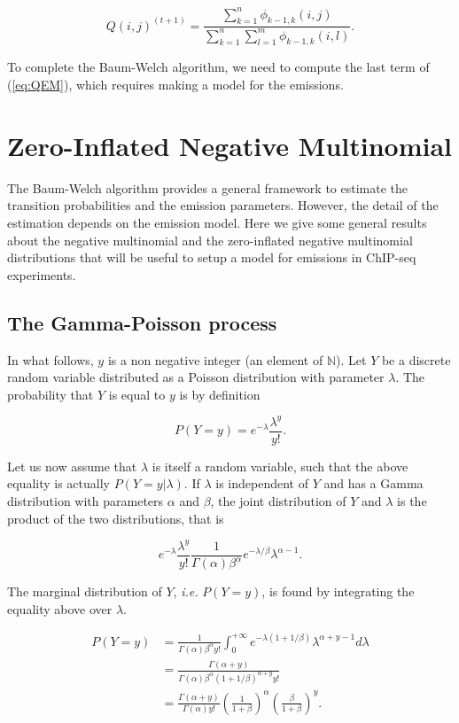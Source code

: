 \documentclass[12pt]{article}
\begin{document}
\begin{appendices}
    $$ Q(i,j)^{(t+1)} = \frac{\sum_{k=1}^n \phi_{k-1,k}(i,j)}
      {\sum_{k=1}^n\sum_{l=1}^m\phi_{k-1,k}(i,l)}. $$
    
    To complete the Baum-Welch algorithm, we need to compute the last
    term of (\ref{eq:QEM}), which requires making a model for the
    emissions.

\section{Zero-Inflated Negative Multinomial}
\label{sec:nb}

The Baum-Welch algorithm provides a general framework to estimate
the transition probabilities and the emission parameters. However,
the detail of the estimation depends on the emission model. Here
we give some general results about the negative multinomial and
the zero-inflated negative multinomial distributions that will
be useful to setup a model for emissions in ChIP-seq experiments.

\subsection{The Gamma-Poisson process}
\label{sec:gamma_poisson}

    In what follows, $y$ is a non negative integer (an element of
    $\mathbb{N}$). Let $Y$ be a discrete random variable distributed
    as a Poisson distribution with parameter $\lambda$. The
    probability that $Y$ is equal to $y$ is by definition

    \begin{equation}
\label{eq:poisson}
      P(Y=y) = e^{-\lambda} \frac{\lambda^y}{y!}.
    \end{equation}

    Let us now assume that $\lambda$ is itself a random variable,
    such that the above equality is actually $P(Y=y | \lambda)$.
    If $\lambda$ is independent of $Y$ and has a Gamma distribution
    with parameters $\alpha$ and $\beta$, the joint distribution of
    $Y$ and $\lambda$ is the product of the two distributions, that
    is

    $$ e^{-\lambda} \frac{\lambda^y}{y!}
         \frac{1}{\Gamma(\alpha)\beta^{\alpha}} e^{-\lambda/\beta}
         \lambda^{\alpha-1}. $$

    The marginal distribution of $Y$, \textit{i.e.} $P(Y=y)$, is found
    by integrating the equality above over $\lambda$.

    \begin{align}
\label{eq:nb_distrib}
      P(Y=y) &= \frac{1}{\Gamma(\alpha)\beta^{\alpha}y!}
         \int_0^{+\infty} e^{-\lambda(1+1/\beta)} \lambda^{\alpha+y-1}
         d\lambda \nonumber \\
        &= \frac{\Gamma(\alpha+y)}{\Gamma(\alpha)\beta^{\alpha}
          (1+1/\beta)^{\alpha+y} y!} \nonumber \\
        &= \frac{\Gamma(\alpha+y)}{\Gamma(\alpha)y!}
          \left(\frac{1}{1+\beta}\right)^{\alpha}
          \left(\frac{\beta}{1+\beta}\right)^y.
    \end{align}


\end{appendices}
\end{document}
